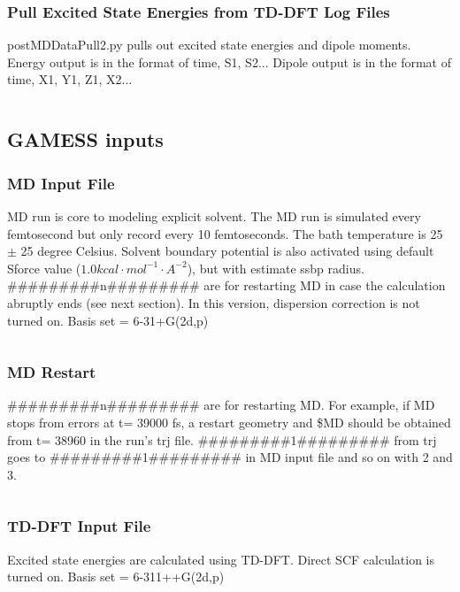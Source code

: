 \documentclass[
journal=jpcbfk, %
manuscript=article]{achemso}
\begin{document}
		\subsubsection{Pull Excited State Energies from TD-DFT Log Files}
			postMDDataPull2.py pulls out excited state energies and dipole moments. Energy output is in the format of time, S1, S2... Dipole output is in the format of time, X1, Y1, Z1, X2...
			\inputminted[linenos, breaklines, baselinestretch=1, fontsize=\small]{python}{../pythonScripts/postMDDataPull2.py} 
		
	\subsection{GAMESS inputs}
		\subsubsection{MD Input File}
			 MD run is core to modeling explicit solvent. The MD run is simulated every femtosecond but only record every 10 femtoseconds. The bath temperature is 25 $\pm$ 25 degree Celsius. Solvent boundary potential is also activated using default Sforce value (\(1.0 kcal\cdot mol^{-1}\cdot A^{-2}\)), but with estimate ssbp radius. \#\#\#\#\#\#\#\#\#n\#\#\#\#\#\#\#\#\# are for restarting MD in case the calculation abruptly ends (see next section). In this version, dispersion correction is not turned on. Basis set = 6-31+G(2d,p)
			 \inputminted[linenos, breaklines, baselinestretch=1, fontsize=\small]{Perl}{../GAMESSinpSample/MD_aniline32.inp}
			 
		\subsubsection{MD Restart}
		\#\#\#\#\#\#\#\#\#n\#\#\#\#\#\#\#\#\# are for restarting MD. For example, if MD stops from errors at t= 39000 fs, a restart geometry and \$MD should be obtained from t= 38960 in the run's trj file. \#\#\#\#\#\#\#\#\#1\#\#\#\#\#\#\#\#\# from trj goes to \#\#\#\#\#\#\#\#\#1\#\#\#\#\#\#\#\#\# in MD input file and so on with 2 and 3.
		\inputminted[linenos, breaklines, baselinestretch=1, fontsize=\small]{Perl}{../GAMESSinpSample/MD_aniline32.trj}
		
		\subsubsection{TD-DFT Input File}
			Excited state energies are calculated using TD-DFT. Direct SCF calculation is turned on. Basis set = 6-311++G(2d,p)
			\inputminted[linenos, breaklines, baselinestretch=1, fontsize=\small]{Perl}{../GAMESSinpSample/TDDFT_aniline32_15010.inp}
\end{document}
